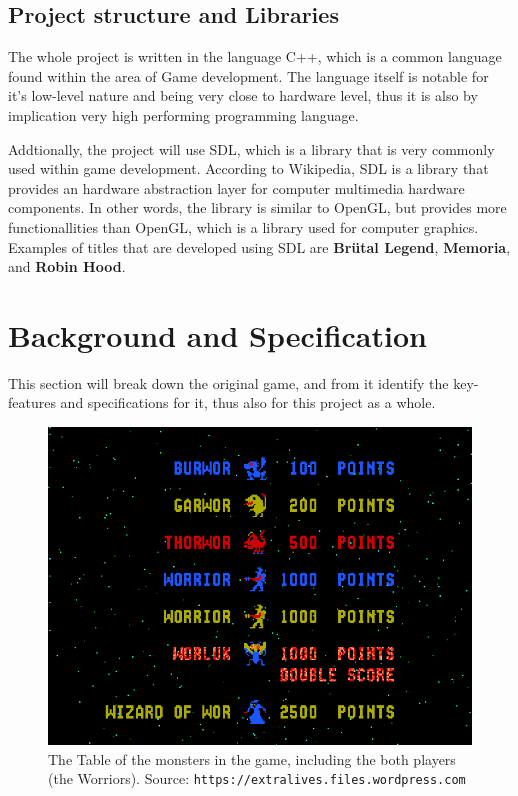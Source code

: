 \documentclass{article}
\begin{document}
  \subsection{Project structure and Libraries}
  The whole project is written in the language C++, which is a common language found within the area of Game development. The language itself is notable for it's low-level nature and being very close to hardware level, thus it is also by implication very high performing programming language.

  Addtionally, the project will use SDL, which is a library that is very commonly used within game development. According to Wikipedia, SDL is a library that provides an hardware abstraction layer for computer multimedia hardware components. In other words, the library is similar to OpenGL, but provides more functionallities than OpenGL, which is a library used for computer graphics. Examples of titles that are developed using SDL are \textbf{Brütal Legend}, \textbf{Memoria}, and \textbf{Robin Hood}.

  \section{Background and Specification}
  This section will break down the original game, and from it identify the key-features and specifications for it, thus also for this project as a whole.

  \begin{figure}
    \includegraphics[scale=0.7]{assets/lateximg/Monstertable}
    \caption{The Table of the monsters in the game, including the both players (the Worriors). Source: \texttt{https://extralives.files.wordpress.com}}
    \label{monstertable}
  \end{figure}
\end{document}
